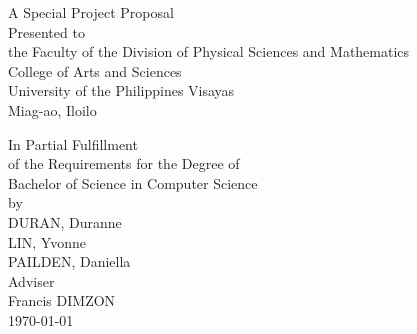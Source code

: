 \begin{titlepage}
\centering


\vspace{1.75cm}
A Special Project Proposal\\
Presented to\\
the Faculty of the Division of Physical Sciences and Mathematics\\
College of Arts and Sciences\\
University of the Philippines Visayas\\
Miag-ao, Iloilo

\vspace{1.75cm}
In Partial Fulfillment\\
of the Requirements for the Degree of\\
Bachelor of Science in Computer Science\\
by\\[1cm]

DURAN, Duranne\\
LIN, Yvonne\\
PAILDEN, Daniella\\

\vspace{1.75cm}
Adviser\\
Francis DIMZON\\

\vspace{1.25cm}
\today

\end{titlepage}
